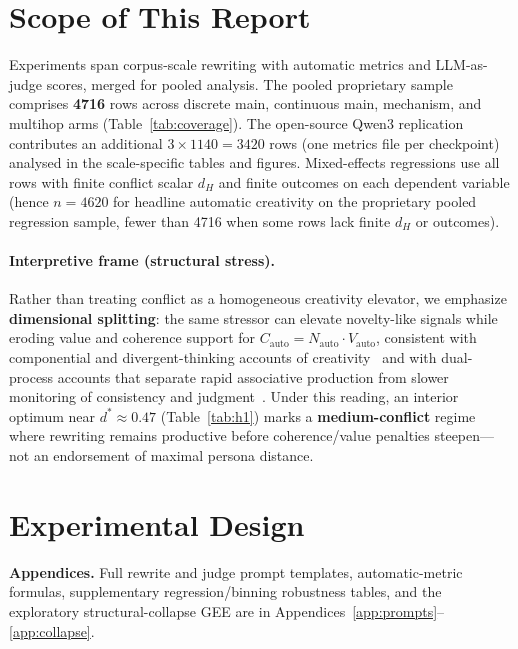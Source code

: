 \documentclass[sigconf,nonacm]{acmart}
\begin{document}
\maketitle

\section{Scope of This Report}

Experiments span corpus-scale rewriting with automatic metrics and LLM-as-judge scores, merged for pooled analysis.
The pooled proprietary sample comprises \textbf{4716} rows across discrete main, continuous main, mechanism, and multihop arms (Table~\ref{tab:coverage}).
The open-source Qwen3 replication contributes an additional $3{\times}1140=3420$ rows (one metrics file per checkpoint) analysed in the scale-specific tables and figures.
Mixed-effects regressions use all rows with finite conflict scalar $d_H$ and finite outcomes on each dependent variable (hence $n{=}4620$ for headline automatic creativity on the proprietary pooled regression sample, fewer than 4716 when some rows lack finite $d_H$ or outcomes).

\paragraph{Interpretive frame (structural stress).}
Rather than treating conflict as a homogeneous creativity elevator, we emphasize \textbf{dimensional splitting}: the same stressor can elevate novelty-like signals while eroding value and coherence support for $C_{\mathrm{auto}}{=}N_{\mathrm{auto}}{\cdot}V_{\mathrm{auto}}$, consistent with componential and divergent-thinking accounts of creativity~\cite{boden,amabile1983,guilford1967,runco} and with dual-process accounts that separate rapid associative production from slower monitoring of consistency and judgment~\cite{kahneman,mednick1962}.
Under this reading, an interior optimum near $d^\ast{\approx}0.47$ (Table~\ref{tab:h1}) marks a \textbf{medium-conflict} regime where rewriting remains productive before coherence/value penalties steepen---not an endorsement of maximal persona distance.

\section{Experimental Design}

\noindent\textbf{Appendices.}
Full rewrite and judge prompt templates, automatic-metric formulas, supplementary regression/binning robustness tables, and the exploratory structural-collapse GEE are in Appendices~\ref{app:prompts}--\ref{app:collapse}.
\end{document}

